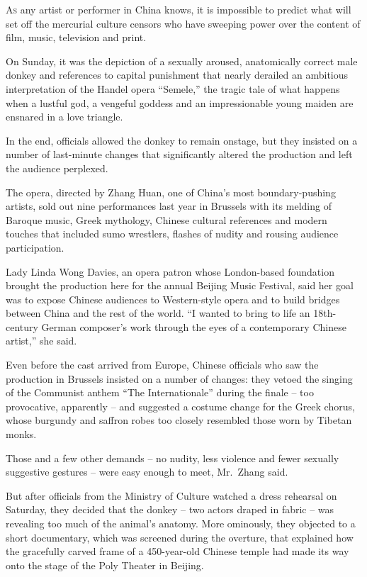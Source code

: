 ﻿\documentclass[12pt]{article}
\begin{document}
\lettrine{A}{s} any artist or performer in China knows, it is impossible to
predict what will set off the mercurial culture censors who have sweeping power over the content of
film, music, television and print.

On Sunday, it was the depiction of a sexually aroused, anatomically correct male donkey and
references to capital punishment that nearly derailed an ambitious interpretation of the Handel
opera ``Semele,'' the tragic tale of what happens when a lustful god, a vengeful goddess and an
impressionable young maiden are ensnared in a love triangle.

In the end, officials allowed the donkey to remain onstage, but they insisted on a number of
last-minute changes that significantly altered the production and left the audience perplexed.

The opera, directed by Zhang Huan, one of China's most boundary-pushing artists, sold out nine
performances last year in Brussels with its melding of Baroque music, Greek mythology, Chinese
cultural references and modern touches that included sumo wrestlers, flashes of nudity and rousing
audience participation.

Lady Linda Wong Davies, an opera patron whose London-based foundation brought the production here
for the annual Beijing Music Festival, said her goal was to expose Chinese audiences to
Western-style opera and to build bridges between China and the rest of the world. ``I wanted to
bring to life an 18th-century German composer's work through the eyes of a contemporary Chinese
artist,'' she said.

Even before the cast arrived from Europe, Chinese officials who saw the production in Brussels
insisted on a number of changes: they vetoed the singing of the Communist anthem ``The
Internationale'' during the finale -- too provocative, apparently -- and suggested a costume change
for the Greek chorus, whose burgundy and saffron robes too closely resembled those worn by Tibetan
monks.

Those and a few other demands -- no nudity, less violence and fewer sexually suggestive gestures --
were easy enough to meet, Mr.~Zhang said.

But after officials from the Ministry of Culture watched a dress rehearsal on Saturday, they decided
that the donkey -- two actors draped in fabric -- was revealing too much of the animal's anatomy.
More ominously, they objected to a short documentary, which was screened during the overture, that
explained how the gracefully carved frame of a 450-year-old Chinese temple had made its way onto the
stage of the Poly Theater in Beijing.
\end{document}

